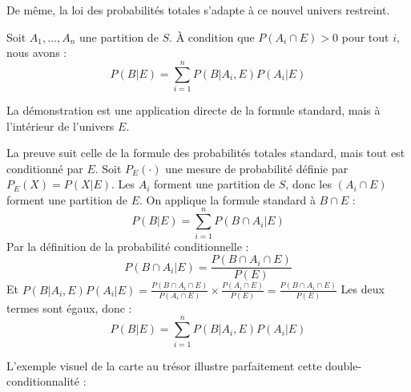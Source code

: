 De même, la loi des probabilités totales s'adapte à ce nouvel univers restreint.

\begin{theorembox}
Soit $A_1, \dots, A_n$ une partition de $S$. À condition que $P(A_i \cap E) > 0$ pour tout $i$, nous avons :
$$P(B|E) = \sum_{i=1}^{n} P(B|A_i, E)P(A_i|E)$$
\end{theorembox}

La démonstration est une application directe de la formule standard, mais à l'intérieur de l'univers $E$.

\begin{proofbox}
La preuve suit celle de la formule des probabilités totales standard, mais tout est conditionné par $E$.
Soit $P_E(\cdot)$ une mesure de probabilité définie par $P_E(X) = P(X|E)$.
Les $A_i$ forment une partition de $S$, donc les $(A_i \cap E)$ forment une partition de $E$.
On applique la formule standard à $B \cap E$ :
$$P(B|E) = \sum_{i=1}^{n} P(B \cap A_i | E)$$
Par la définition de la probabilité conditionnelle :
$$P(B \cap A_i | E) = \frac{P(B \cap A_i \cap E)}{P(E)}$$
Et $P(B|A_i, E)P(A_i|E) = \frac{P(B \cap A_i \cap E)}{P(A_i \cap E)} \times \frac{P(A_i \cap E)}{P(E)} = \frac{P(B \cap A_i \cap E)}{P(E)}$
Les deux termes sont égaux, donc :
$$P(B|E) = \sum_{i=1}^{n} P(B|A_i, E)P(A_i|E)$$
\end{proofbox}

L'exemple visuel de la carte au trésor illustre parfaitement cette double-conditionnalité :

